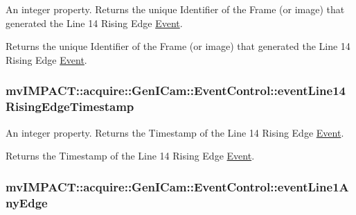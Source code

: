 An integer property. Returns the unique Identifier of the Frame (or image) that generated the Line 14 Rising Edge \hyperlink{classmv_i_m_p_a_c_t_1_1acquire_1_1_event}{Event}. 

Returns the unique Identifier of the Frame (or image) that generated the Line 14 Rising Edge \hyperlink{classmv_i_m_p_a_c_t_1_1acquire_1_1_event}{Event}. \hypertarget{classmv_i_m_p_a_c_t_1_1acquire_1_1_gen_i_cam_1_1_event_control_ac8a9bf0b4f1c5aa8263586b7edf47de6}{
\subsubsection[{event\+Line14\+Rising\+Edge\+Timestamp}]{ mv\+I\+M\+P\+A\+C\+T\+::acquire\+::\+Gen\+I\+Cam\+::\+Event\+Control\+::event\+Line14\+Rising\+Edge\+Timestamp}}\label{classmv_i_m_p_a_c_t_1_1acquire_1_1_gen_i_cam_1_1_event_control_ac8a9bf0b4f1c5aa8263586b7edf47de6}


An integer property. Returns the Timestamp of the Line 14 Rising Edge \hyperlink{classmv_i_m_p_a_c_t_1_1acquire_1_1_event}{Event}. 

Returns the Timestamp of the Line 14 Rising Edge \hyperlink{classmv_i_m_p_a_c_t_1_1acquire_1_1_event}{Event}. \hypertarget{classmv_i_m_p_a_c_t_1_1acquire_1_1_gen_i_cam_1_1_event_control_a627dee778fe30f88c3c380fbd167b74c}{
\subsubsection[{event\+Line1\+Any\+Edge}]{ mv\+I\+M\+P\+A\+C\+T\+::acquire\+::\+Gen\+I\+Cam\+::\+Event\+Control\+::event\+Line1\+Any\+Edge}}\label{classmv_i_m_p_a_c_t_1_1acquire_1_1_gen_i_cam_1_1_event_control_a627dee778fe30f88c3c380fbd167b74c}


